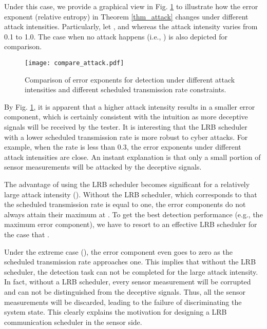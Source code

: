 \documentclass[journal]{IEEEtran}
\begin{document}
Under this case, we provide a graphical view in Fig. \ref{fig_comparison2} to illustrate how the error exponent (relative entropy) in Theorem \ref{thm_attack} changes under different attack intensities. Particularly, let ,  and  whereas the attack intensity varies from 0.1 to 1.0. The case when no attack happens (i.e., ) is also depicted for comparison.

\begin{figure}[htbp!]
  \centering
  \texttt{[image: compare\_attack.pdf]}
    \caption{ Comparison of error exponents for detection under different attack intensities and different scheduled transmission rate constraints.}
    \label{fig_comparison2}
\end{figure}

By Fig. \ref{fig_comparison2}, it is apparent that a higher attack intensity results in a smaller error component, which is certainly consistent with the intuition as more deceptive signals will be received by the tester. It is interesting that the LRB scheduler with a lower scheduled transmission rate is more robust to cyber attacks. For example, when the rate is less than 0.3, the error exponents under different attack intensities are close. An instant explanation is that only a small portion of sensor measurements will be attacked by the deceptive signals.

The advantage of using the LRB scheduler becomes significant for a relatively large attack intensity (). Without the LRB scheduler, which corresponds to that the scheduled transmission rate is equal to one, the error components do not always attain their maximum at . To get the best detection performance (e.g., the maximum error component), we have to resort to an effective LRB scheduler for the case that .



Under the extreme case (), the error component even goes to zero as the scheduled transmission rate approaches one.  This implies that without  the LRB scheduler, the detection task can not be completed for the large attack intensity. In fact, without a LRB scheduler, every sensor measurement will be corrupted and can not be distinguished from the deceptive signals. Thus, all the sensor measurements will be discarded, leading to the failure of discriminating the system state.  This clearly explains the motivation for designing a LRB communication scheduler in the sensor side.
\end{document}
